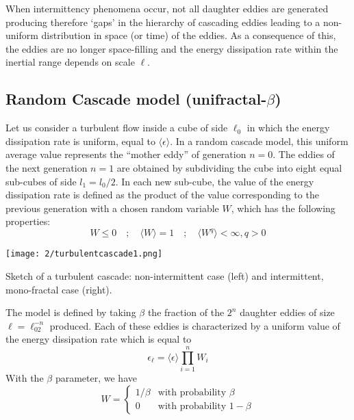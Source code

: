When intermittency phenomena occur, not all daughter eddies are generated producing therefore ‘gaps’ in the hierarchy of cascading eddies leading to a non-uniform distribution in space (or time) of the eddies. As a consequence of this, the eddies are no longer space-filling and the energy
dissipation rate within the inertial range depends on scale $\ell$.

\subsection{Random Cascade model (unifractal-$\beta$)}

Let us consider a turbulent flow inside a cube of side $\ell_0$ in which the energy dissipation rate is uniform, equal to $\langle\epsilon\rangle$. In a random cascade model, this uniform average value represents the “mother eddy” of generation $n = 0$. The eddies of the next generation $n = 1$ are obtained by subdividing the cube into eight equal
sub-cubes of side $l_1 = l_0 /2$. In each new sub-cube, the value of the energy dissipation rate is defined as the product of the value corresponding to the previous generation with a chosen random variable $W$, which has the following properties:
\begin{equation}
    W\leq0\quad;\quad\langle W\rangle=1\quad;\quad \langle W^q\rangle<\infty,q>0
\end{equation}
\begin{marginfigure}
\texttt{[image: 2/turbulentcascade1.png]}
\caption{Sketch of a turbulent cascade: non-intermittent case (left) and
intermittent, mono-fractal case (right).}
\label{fig:2-fcascade}
\end{marginfigure}
The model is defined by taking $\beta$ the fraction of the $2^n$ daughter eddies of size $\ell=\ell_02^{-n}$ produced. Each of these eddies is characterized by a uniform value of the energy dissipation rate which is equal to
\begin{equation}
    \epsilon_\ell=\langle\epsilon\rangle\prod_{i=1}^nW_i
\end{equation}
With the $\beta$ parameter, we have
\begin{equation}
    W=\begin{cases}
    1/\beta & \text{with probability } \beta\\
    0 &  \text{with probability } 1-\beta\end{cases}
\end{equation}
